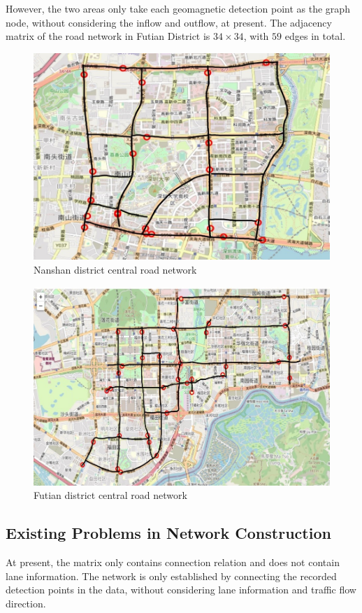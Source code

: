 \documentclass[fontset=none]{ctexart}
\theoremstyle{definition}
\theoremstyle{remark}
\begin{document}
However, the two areas only take each geomagnetic detection point as the graph node, without considering the inflow and outflow, at present. The adjacency matrix of the road network in Futian District is $34\times34$, with $59$ edges in total.
\begin{figure}[htb]
  \centering
  \includegraphics[width=\textwidth]{images/9-3-1.jpg}
  \caption{Nanshan district central road network}
  \label{931}
\end{figure}
\clearpage
\begin{figure}[htb]
  \centering
  \includegraphics[width=\textwidth]{images/9-3-2.jpg}
  \caption{Futian district central road network}
  \label{932}
\end{figure}

\clearpage
\subsection{Existing Problems in Network Construction}
At present, the matrix only contains connection relation and does not contain lane information. The network is only established by connecting the recorded detection points in the data, without considering lane information and traffic flow direction.  
\end{document}
